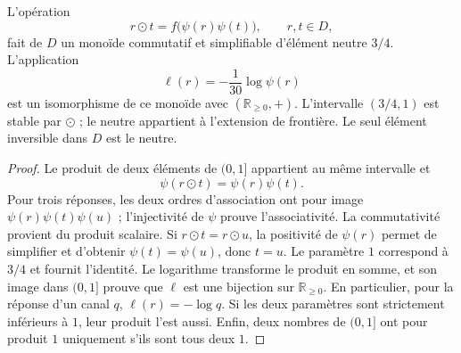 \begin{proposition}
\label{cr28:comp-monoid}
L’opération
\begin{equation}
 r\odot t=f\bigl(\psi(r)\psi(t)\bigr),\qquad r,t\in D,
 \label{cr28:comp-law}
\end{equation}
fait de $D$ un monoïde commutatif et simplifiable d’élément neutre $3/4$.
L’application
\begin{equation}
 \ell(r)=-\frac1{30}\log\psi(r)
 \label{cr28:comp-character}
\end{equation}
est un isomorphisme de ce monoïde avec $(\mathbb R_{\geq0},+)$.
L’intervalle $(3/4,1)$ est stable par $\odot$ ; le neutre appartient à
l’extension de frontière. Le seul élément inversible dans $D$
est le neutre.
\end{proposition}
\begin{proof}
Le produit de deux éléments de $(0,1]$ appartient au même intervalle et
\[
 \psi(r\odot t)=\psi(r)\psi(t).
\]
Pour trois réponses, les deux ordres d’association ont pour image
$\psi(r)\psi(t)\psi(u)$ ; l’injectivité de $\psi$ prouve
l’associativité. La commutativité provient du produit scalaire. Si
$r\odot t=r\odot u$, la positivité de $\psi(r)$ permet de simplifier et
d’obtenir $\psi(t)=\psi(u)$, donc $t=u$. Le paramètre $1$ correspond à
$3/4$ et fournit l’identité. Le logarithme transforme le produit en
somme, et son image dans $(0,1]$ prouve que $\ell$ est une bijection sur
$\mathbb R_{\geq0}$. En particulier, pour la réponse d’un canal $q$,
$\ell(r)=-\log q$. Si les deux paramètres sont strictement inférieurs à
$1$, leur produit l’est aussi. Enfin, deux nombres de $(0,1]$
ont pour produit $1$ uniquement s’ils sont tous deux $1$.
\end{proof}

